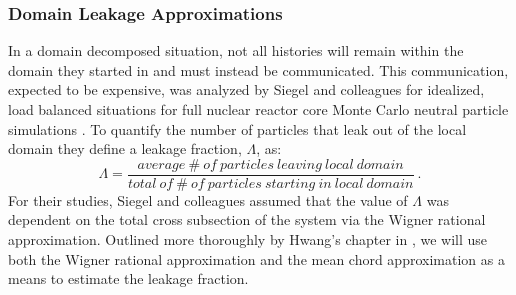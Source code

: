\subsubsection{Domain Leakage Approximations}
\label{subsubsec:domain_leak_approx}
In a domain decomposed situation, not all histories will remain within
the domain they started in and must instead be communicated. This
communication, expected to be expensive, was analyzed by Siegel and
colleagues for idealized, load balanced situations for full nuclear
reactor core Monte Carlo neutral particle simulations
\citep{siegel_analysis_2012}.  To quantify the number of particles
that leak out of the local domain they define a leakage fraction,
$\Lambda$, as:
\begin{equation}
  \Lambda = \frac{average\ \#\ of\ particles\ leaving\ local\ domain}
          {total\ of\ \#\ of\ particles\ starting\ in\ local\ domain}\:.
          \label{eq:leakage_fraction}
\end{equation}
For their studies, Siegel and colleagues assumed that the value of
$\Lambda$ was dependent on the total cross subsection of the system via
the Wigner rational approximation. Outlined more thoroughly by Hwang's
chapter in \citep{azmy_nuclear_2010}, we will use both the Wigner
rational approximation and the mean chord approximation as a means to
estimate the leakage fraction.

